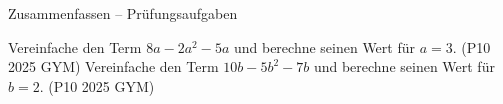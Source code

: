 \begin{aufgabe}{Zusammenfassen – Prüfungsaufgaben}
\begin{teile}
\teil Vereinfache den Term $8a - 2a^2 - 5a$ und berechne seinen Wert für $a = 3$. \hfill (P10 2025 GYM)
\teil Vereinfache den Term $10b - 5b^2 - 7b$ und berechne seinen Wert für $b = 2$. \hfill (P10 2025 GYM)
\end{teile}
\end{aufgabe}
